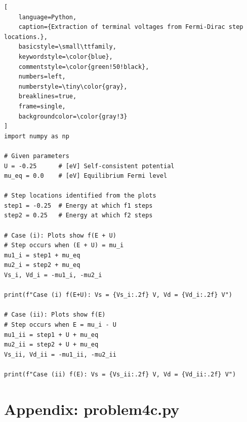 \documentclass[a4paper, 10pt]{article}
\begin{document}
\begin{lstlisting}[
    language=Python,
    caption={Extraction of terminal voltages from Fermi-Dirac step locations.},
    basicstyle=\small\ttfamily,
    keywordstyle=\color{blue},
    commentstyle=\color{green!50!black},
    numbers=left,
    numberstyle=\tiny\color{gray},
    breaklines=true,
    frame=single,
    backgroundcolor=\color{gray!3}
]
import numpy as np

# Given parameters
U = -0.25      # [eV] Self-consistent potential
mu_eq = 0.0    # [eV] Equilibrium Fermi level

# Step locations identified from the plots
step1 = -0.25  # Energy at which f1 steps
step2 = 0.25   # Energy at which f2 steps

# Case (i): Plots show f(E + U)
# Step occurs when (E + U) = mu_i
mu1_i = step1 + mu_eq
mu2_i = step2 + mu_eq
Vs_i, Vd_i = -mu1_i, -mu2_i

print(f"Case (i) f(E+U): Vs = {Vs_i:.2f} V, Vd = {Vd_i:.2f} V")

# Case (ii): Plots show f(E)
# Step occurs when E = mu_i - U
mu1_ii = step1 + U + mu_eq
mu2_ii = step2 + U + mu_eq
Vs_ii, Vd_ii = -mu1_ii, -mu2_ii

print(f"Case (ii) f(E): Vs = {Vs_ii:.2f} V, Vd = {Vd_ii:.2f} V")
\end{lstlisting}

\section*{Appendix: problem4c.py}
\label{appendix:mosfet_window}
\end{document}
